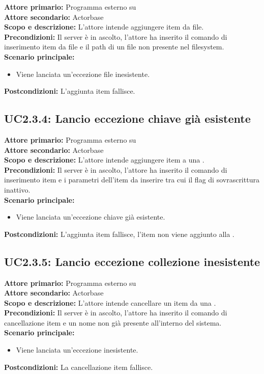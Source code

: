 \documentclass{scalatekids-article}
\begin{document}
\textbf{Attore primario:} Programma esterno su \\
\textbf{Attore secondario:} Actorbase\\
\textbf{Scopo e descrizione:}
L'attore intende aggiungere item da file.\\
\textbf{Precondizioni:} Il server è in ascolto, l'attore ha inserito il comando di inserimento item da file e il path di un file non presente nel filesystem.\\
\textbf{Scenario principale:}
\begin{itemize}
\item Viene lanciata un'eccezione file inesistente.
\end{itemize}
\textbf{Postcondizioni:} L'aggiunta item fallisce.

\subsection{UC2.3.4: Lancio eccezione chiave già esistente}

\textbf{Attore primario:} Programma esterno su \\
\textbf{Attore secondario:} Actorbase\\
\textbf{Scopo e descrizione:}
L'attore intende aggiungere item a una .\\
\textbf{Precondizioni:} Il server è in ascolto, l'attore ha inserito il comando di inserimento item e i parametri dell'item da inserire tra cui il flag di sovrascrittura inattivo.\\
\textbf{Scenario principale:}
\begin{itemize}
\item Viene lanciata un'eccezione chiave già esistente.
\end{itemize}
\textbf{Postcondizioni:} L'aggiunta item fallisce, l'item non viene aggiunto alla .

\subsection{UC2.3.5: Lancio eccezione collezione inesistente}

\textbf{Attore primario:} Programma esterno su \\
\textbf{Attore secondario:} Actorbase\\
\textbf{Scopo e descrizione:}
L'attore intende cancellare un item da una .\\
\textbf{Precondizioni:} Il server è in ascolto, l'attore ha inserito il comando di cancellazione item e un nome  non già presente all'interno del sistema.\\
\textbf{Scenario principale:}
\begin{itemize}
\item Viene lanciata un'eccezione  inesistente.
\end{itemize}
\textbf{Postcondizioni:} La cancellazione item fallisce.
\end{document}
